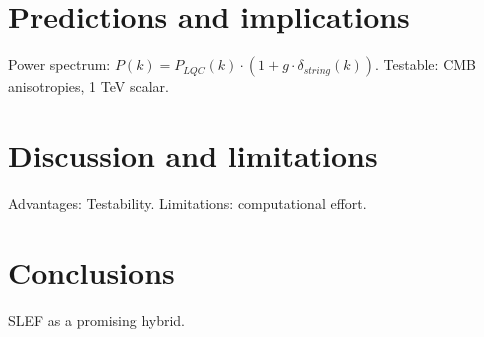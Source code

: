 \documentclass[11pt,a4paper]{article}
\begin{document}
	\section{Predictions and implications}
	Power spectrum: $P(k) = P_{LQC}(k) \cdot (1 + g \cdot \delta_{string}(k))$. Testable: CMB anisotropies, 1 TeV scalar.
	
	\section{Discussion and limitations}
	Advantages: Testability. Limitations: computational effort.
	
	\section{Conclusions}
	SLEF as a promising hybrid.
	
	
	
	
\end{document}
